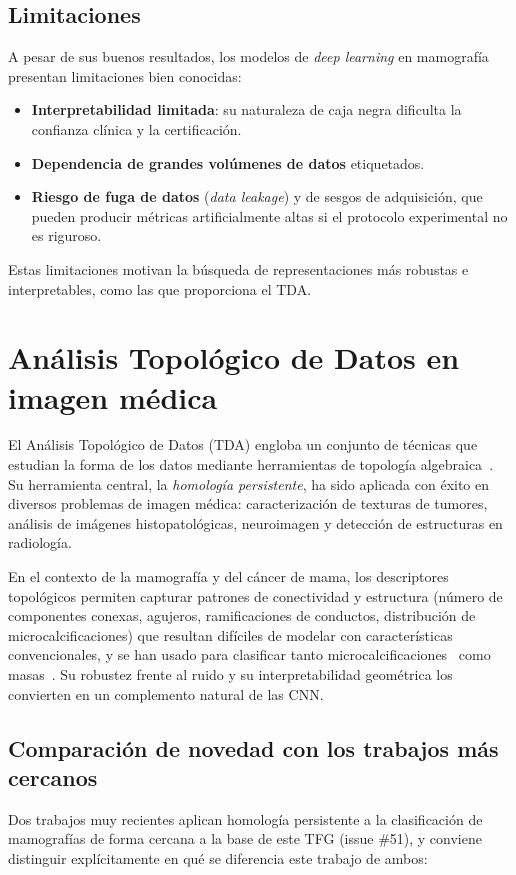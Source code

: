 \subsection{Limitaciones}
A pesar de sus buenos resultados, los modelos de \textit{deep learning} en
mamografía presentan limitaciones bien conocidas:
\begin{itemize}
  \item \textbf{Interpretabilidad limitada}: su naturaleza de caja negra
        dificulta la confianza clínica y la certificación.
  \item \textbf{Dependencia de grandes volúmenes de datos} etiquetados.
  \item \textbf{Riesgo de fuga de datos} (\textit{data leakage}) y de sesgos
        de adquisición, que pueden producir métricas artificialmente altas si el
        protocolo experimental no es riguroso.
\end{itemize}
Estas limitaciones motivan la búsqueda de representaciones más robustas e
interpretables, como las que proporciona el TDA.

\section{Análisis Topológico de Datos en imagen médica}
\label{sec:tda-imagen-medica}
El Análisis Topológico de Datos (TDA) engloba un conjunto de técnicas que
estudian la forma de los datos mediante herramientas de topología
algebraica~\cite{carlsson2009topology, edelsbrunner2010computational}. Su
herramienta central, la \emph{homología persistente}, ha sido aplicada con éxito
en diversos problemas de imagen médica: caracterización de texturas de tumores,
análisis de imágenes histopatológicas, neuroimagen y detección de estructuras en
radiología.

En el contexto de la mamografía y del cáncer de mama, los descriptores
topológicos permiten capturar patrones de conectividad y estructura (número de
componentes conexas, agujeros, ramificaciones de conductos, distribución de
microcalcificaciones) que resultan difíciles de modelar con características
convencionales, y se han usado para clasificar tanto
microcalcificaciones~\cite{malek2023microcalc} como
masas~\cite{asaad2022phbreast}. Su robustez frente al ruido y su interpretabilidad geométrica
los convierten en un complemento natural de las CNN.

\subsection{Comparación de novedad con los trabajos más cercanos}
\label{subsec:novedad-jetomo-epj}
Dos trabajos muy recientes aplican homología persistente a la clasificación
de mamografías de forma cercana a la base de este TFG (issue \#51), y
conviene distinguir explícitamente en qué se diferencia este trabajo de
ambos:


